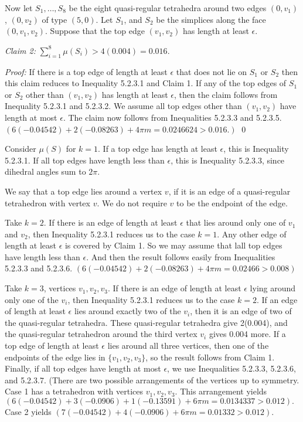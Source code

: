 Now let $S_1,\dots,S_8$ be the eight quasi-regular tetrahedra around two 
edges 
$(0,v_1)$, $(0,v_2)$ of type $(5,0)$.  Let $S_1$, and $S_2$ be the simplices along the face $(0,v_1,v_2)$.  Suppose that the top edge $(v_1,v_2)$ has length at least $\epsilon$.  

{\it Claim 2:}  $\sum_{i=1}^8 \mu(S_i) > 4(0.004)=0.016.$ 

{\it Proof:}  If there is a top edge of length at least $\epsilon$ that does not lie on $S_1$ or $S_2$ then this claim reduces to Inequality 5.2.3.1 and Claim 1.  If any of the top edges of $S_1$ or $S_2$ other than $(v_1,v_2)$ has length at least $\epsilon$, then the claim follows from Inequality 5.2.3.1 and 5.2.3.2.  We assume all top edges other than $(v_1,v_2)$ have length at most $\epsilon$.  The claim now follows from Inequalities 5.2.3.3 and 5.2.3.5.  
 $(6(-0.04542) + 2 (-0.08263) + 4 \pi m = 0.0246624 > 0.016.)$ 
 \qed

Consider $\mu(S)$ for $k=1$.  If a top edge has length at least $\epsilon$, this is Inequality 5.2.3.1.  If all top edges have length less than $\epsilon$, this is Inequality 5.2.3.3, since dihedral angles sum to $2 \pi$.  

We say that a top edge lies around a vertex $v$, if it is an edge of a quasi-regular tetrahedron with vertex $v$.  We do not require $v$ to be the endpoint of the edge.

Take $k=2$.  If there is an edge of length at least $\epsilon$ that lies around only one of $v_1$ and $v_2$, then Inequality 5.2.3.1 reduces us to the case $k=1$.  Any other edge of length at least $\epsilon$ is covered by Claim 1.  So we may  assume that lall top edges have length less than $\epsilon$.  And then the result follows easily from Inequalities 5.2.3.3 and 5.2.3.6. 
$( 6 (-0.04542)+2(-0.08263) +4 \pi m = 0.02466 > 0.008 )$

Take $k=3$, vertices $v_1,v_2,v_3$.  If there is an edge of length at least $\epsilon$ lying around only one of the $v_i$, then Inequality 5.2.3.1 reduces us to the case $k=2$.  If an edge of length at least $\epsilon$ lies around exactly two of the $v_i$, then it is an edge of two of the quasi-regular tetrahedra.  These quasi-regular tetrahedra give 2(0.004), and the quasi-regular tetrahedron around the third vertex $v_i$ gives 0.004 more.  If a top edge of length at least $\epsilon$ lies around all three vertices, then one of the endpoints of the edge lies in $\{v_1,v_2,v_3\}$, so the result follows from Claim 1.  Finally, if all top edges have length at most $\epsilon$, we use Inequalities 5.2.3.3, 5.2.3.6, and 5.2.3.7.  (There are two possible arrangements of the vertices up to symmetry.  Case 1 has a tetrahedron with vertices $v_1,v_2,v_3$.  This arrangement yields 
$(6(-0.04542)+3(-0.0906)+1(-0.13591)+6 \pi m = 0.0134337 > 0.012).$  
Case 2 yields 
$(7(-0.04542)+4(-0.0906)+6 \pi m = 0.01332 > 0.012)$.

